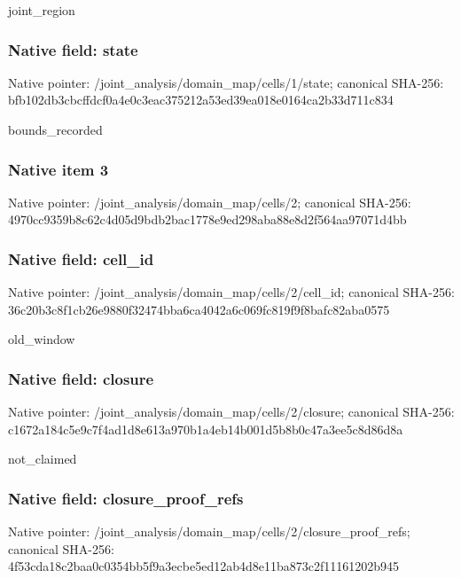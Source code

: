 \documentclass[10pt,a4paper]{article}
\begin{document}
\begingroup\raggedright\sloppy joint\_\allowbreak{}region\par\endgroup

\subsubsection{Native field: state}
Native pointer: /joint\_\allowbreak{}analysis/domain\_\allowbreak{}map/cells/1/state; canonical SHA-256: bfb102db3cbcffdcf0a4e0c3eac375212a53ed39ea018e0164ca2b33d711c834

\begingroup\raggedright\sloppy bounds\_\allowbreak{}recorded\par\endgroup

\subsubsection{Native item 3}
Native pointer: /joint\_\allowbreak{}analysis/domain\_\allowbreak{}map/cells/2; canonical SHA-256: 4970cc9359b8c62c4d05d9bdb2bac1778e9ed298aba88e8d2f564aa97071d4bb

\subsubsection{Native field: cell\_\allowbreak{}id}
Native pointer: /joint\_\allowbreak{}analysis/domain\_\allowbreak{}map/cells/2/cell\_\allowbreak{}id; canonical SHA-256: 36c20b3c8f1cb26e9880f32474bba6ca4042a6c069fc819f9f8bafc82aba0575

\begingroup\raggedright\sloppy old\_\allowbreak{}window\par\endgroup

\subsubsection{Native field: closure}
Native pointer: /joint\_\allowbreak{}analysis/domain\_\allowbreak{}map/cells/2/closure; canonical SHA-256: c1672a184c5e9c7f4ad1d8e613a970b1a4eb14b001d5b8b0c47a3ee5c8d86d8a

\begingroup\raggedright\sloppy not\_\allowbreak{}claimed\par\endgroup

\subsubsection{Native field: closure\_\allowbreak{}proof\_\allowbreak{}refs}
Native pointer: /joint\_\allowbreak{}analysis/domain\_\allowbreak{}map/cells/2/closure\_\allowbreak{}proof\_\allowbreak{}refs; canonical SHA-256: 4f53cda18c2baa0c0354bb5f9a3ecbe5ed12ab4d8e11ba873c2f11161202b945
\end{document}
